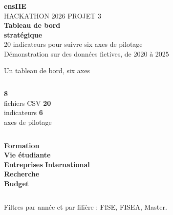 \documentclass[aspectratio=169,12pt]{beamer}
\begin{document}
\begin{frame}[plain]
  \vspace{0.62cm}
  {\Large\bfseries\color{white}ensIIE}\\[0.16cm]
  {\large\color{ensiieOrange}HACKATHON 2026 \quad PROJET 3}\\[1.04cm]
  {\fontsize{42}{48}\selectfont\bfseries\color{white}Tableau de bord\\ stratégique}\\[0.42cm]
  {\Large\color{white}20 indicateurs pour suivre six axes de pilotage}\\[1.08cm]
  {\large\color{white}Démonstration sur des données fictives, de 2020 à 2025}
\end{frame}

\begin{frame}{Un tableau de bord, six axes}
  \vspace{0.08cm}
  \begin{columns}[T,onlytextwidth]
    \centering
      {\fontsize{43}{48}\selectfont\bfseries\color{ensiieBlue}8}\\[0.04cm]
      {\large\color{ensiieGray}fichiers CSV}
    \centering
      {\fontsize{43}{48}\selectfont\bfseries\color{ensiieBlue}20}\\[0.04cm]
      {\large\color{ensiieGray}indicateurs}
    \centering
      {\fontsize{43}{48}\selectfont\bfseries\color{ensiieBlue}6}\\[0.04cm]
      {\large\color{ensiieGray}axes de pilotage}
  \end{columns}
  \vspace{0.63cm}
  \begin{columns}[T,onlytextwidth]
      {\Large\bfseries Formation}\\[0.15cm]
      {\Large\bfseries Vie étudiante}\\[0.15cm]
      {\Large\bfseries Entreprises}
      {\Large\bfseries International}\\[0.15cm]
      {\Large\bfseries Recherche}\\[0.15cm]
      {\Large\bfseries Budget}
  \end{columns}
  \vfill
  {\large\color{ensiieGray}Filtres par année et par filière : FISE, FISEA, Master.}
\end{frame}
\end{document}
